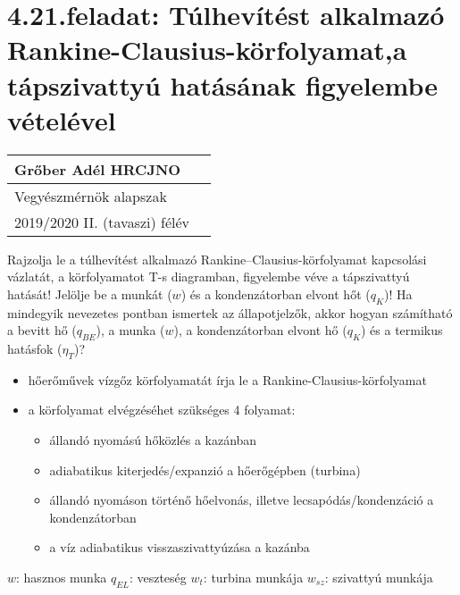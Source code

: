 
\section*{4.21.feladat: Túlhevítést alkalmazó Rankine-Clausius-körfolyamat,a tápszivattyú hatásának figyelembe vételével}


\begin{tabular}{ | p{5cm} | p{14cm} | } 
	\hline
	Grőber Adél HRCJNO\\ 
	\hline
	Vegyészmérnök alapszak\\ 
	\hline
	2019/2020 II. (tavaszi) félév \\ 
	\hline
\end{tabular}
\vspace{0.5cm}

\noindent Rajzolja le a túlhevítést alkalmazó Rankine–Clausius-körfolyamat kapcsolási vázlatát, a körfolyamatot T-s diagramban, figyelembe véve a tápszivattyú hatását! Jelölje be a munkát ($w$) és a kondenzátorban elvont hőt ($q_K$)! Ha mindegyik nevezetes pontban ismertek az állapotjelzők, akkor hogyan számítható a bevitt hő ($q_{BE}$), a munka ($w$), a kondenzátorban elvont hő ($q_K$) és a termikus hatásfok ($\eta_T$)?


\begin{center}

\begin{itemize}
	\item 	hőerőművek vízgőz körfolyamatát írja le a Rankine-Clausius-körfolyamat
	\item a körfolyamat elvégzéséhet szükséges 4 folyamat:
	\begin{itemize}
		\item állandó nyomású hőközlés a kazánban
		\item adiabatikus kiterjedés/expanzió a hőerőgépben (turbina)
		\item állandó nyomáson történő hőelvonás, illetve lecsapódás/kondenzáció a kondenzátorban
		\item a víz adiabatikus visszaszivattyúzása a kazánba
		\
	\end{itemize}
\end{itemize}
\vspace{1 cm}	
$w$: hasznos munka  $q_{EL}$:  veszteség 	$w_{t}$: turbina munkája 		$w_{sz}$: szivattyú munkája
\end{center}

